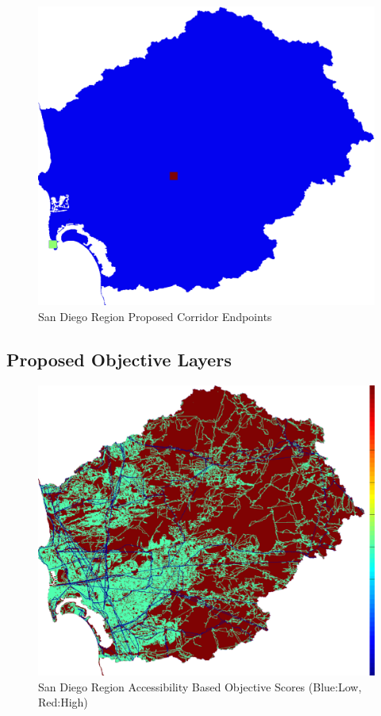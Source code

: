         \begin{figure}[!h]
            \begin{center}
            \includegraphics[width=5.5in]{figures/SanDiego_Endpoints.png}   
            \caption{San Diego Region Proposed Corridor Endpoints}
            \label{fig:SDendpoints}
            \end{center}
        \end{figure}

    \subsection{Proposed Objective Layers}

        \begin{figure}[!h]
            \begin{center}
            \includegraphics[width=5.5in]{figures/SanDiego_AccessibilityScore.png}   
            \caption{San Diego Region Accessibility Based Objective Scores (Blue:Low, Red:High)}
            \label{fig:SDaccessibilty}
            \end{center}
        \end{figure}

